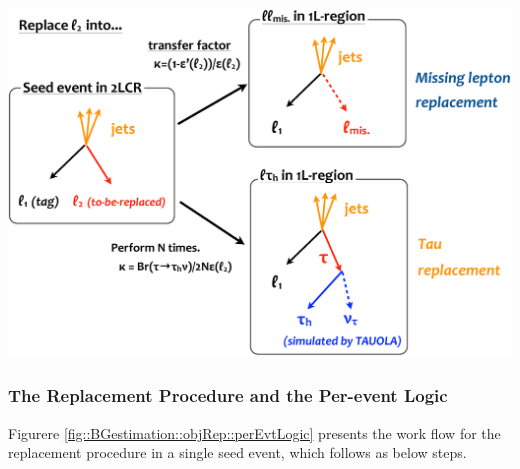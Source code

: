 \includegraphics[width=160mm]{figures/BGestimation/ObjReplacement/method/schematic_replacement.eps}
\label{fig::BGestimation::objRep::schematic1}

\clearpage
\subsubsection{The Replacement Procedure and the Per-event Logic} \label{sec::BGestimation::objRep::perEvtLogic}
Figurere \ref{fig::BGestimation::objRep::perEvtLogic} presents the work flow for the replacement procedure in a single seed event, which follows as below steps. \\

